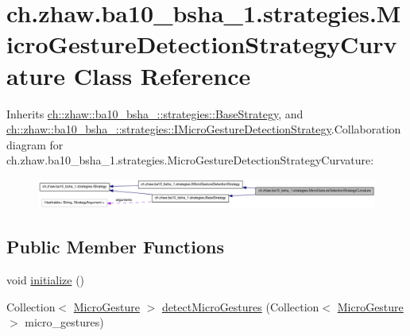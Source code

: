 \hypertarget{classch_1_1zhaw_1_1ba10__bsha__1_1_1strategies_1_1MicroGestureDetectionStrategyCurvature}{
\section{ch.zhaw.ba10\_\-bsha\_\-1.strategies.MicroGestureDetectionStrategyCurvature Class Reference}
\label{classch_1_1zhaw_1_1ba10__bsha__1_1_1strategies_1_1MicroGestureDetectionStrategyCurvature}
}


Inherits \hyperlink{classch_1_1zhaw_1_1ba10__bsha__1_1_1strategies_1_1BaseStrategy}{ch::zhaw::ba10\_\-bsha\_::strategies::BaseStrategy}, and \hyperlink{interfacech_1_1zhaw_1_1ba10__bsha__1_1_1strategies_1_1IMicroGestureDetectionStrategy}{ch::zhaw::ba10\_\-bsha\_::strategies::IMicroGestureDetectionStrategy}.Collaboration diagram for ch.zhaw.ba10\_\-bsha\_\-1.strategies.MicroGestureDetectionStrategyCurvature:\nopagebreak
\begin{figure}[H]
\begin{center}
\leavevmode
\includegraphics[width=400pt]{classch_1_1zhaw_1_1ba10__bsha__1_1_1strategies_1_1MicroGestureDetectionStrategyCurvature__coll__graph}
\end{center}
\end{figure}
\subsection*{Public Member Functions}
\begin{DoxyCompactItemize}
\item 
void \hyperlink{classch_1_1zhaw_1_1ba10__bsha__1_1_1strategies_1_1MicroGestureDetectionStrategyCurvature_a294fbd255e0bcd3e5dd452f1ad8e3f85}{initialize} ()
\item 
Collection$<$ \hyperlink{classch_1_1zhaw_1_1ba10__bsha__1_1_1service_1_1MicroGesture}{MicroGesture} $>$ \hyperlink{classch_1_1zhaw_1_1ba10__bsha__1_1_1strategies_1_1MicroGestureDetectionStrategyCurvature_a939545a8c5597d693f4857a8f6195fc9}{detectMicroGestures} (Collection$<$ \hyperlink{classch_1_1zhaw_1_1ba10__bsha__1_1_1service_1_1MicroGesture}{MicroGesture} $>$ micro\_\-gestures)
\end{DoxyCompactItemize}

